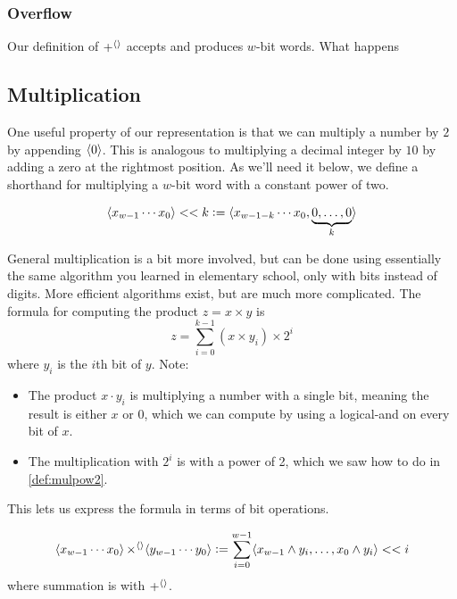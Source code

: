 \subsubsection{Overflow}

Our definition of $\operatorname{+^{\langle\rangle}}$ accepts and produces $w$-bit words.  What happens 

\subsection{Multiplication}
\label{sec:bit-multiplication}

One useful property of our representation is that we can multiply a
number by $2$ by appending $\langle 0 \rangle$.  This is analogous to
multiplying a decimal integer by $10$ by adding a zero at the
rightmost position.  As we'll need it below, we define a shorthand for
multiplying a $w$-bit word with a constant power of two.
\begin{definition}
  \begin{align*}
  \langle x_{w-1}\cdots{}x_{0} \rangle << k \vcentcolon=
  \langle x_{w-1-k}\cdots{}x_{0},\underbrace{0,\ldots,0}_{k} \rangle
  \end{align*}
  \label{def:mulpow2}
\end{definition}

General multiplication is a bit more involved, but can be done using
essentially the same algorithm you learned in elementary school, only
with bits instead of digits.  More efficient algorithms exist, but are
much more complicated.  The formula for computing the product
$z=x\times{}y$ is
\begin{equation}
  z = \sum_{i=0}^{k-1} (x \times y_{i}) \times 2^{i}
\end{equation}
where $y_{i}$ is the $i$th bit of $y$.  Note:
\begin{itemize}
\item The product $x \cdot y_{i}$ is multiplying a number with a
  single bit, meaning the result is either $x$ or $0$, which we can
  compute by using a logical-and on every bit of $x$.
\item The multiplication with $2^{i}$ is with a power of 2, which we
  saw how to do in \cref{def:mulpow2}.
\end{itemize}

This lets us express the formula in terms of bit operations.

\begin{definition}
\begin{align*}
  \langle x_{w-1}\cdots{}x_{0} \rangle \operatorname{\times^{\langle\rangle}} \langle y_{w-1}\cdots{}y_{0} \rangle \vcentcolon=
  \sum_{i=0}^{w-1} \langle x_{w-1} \land y_{i},\ldots,x_{0} \land y_{i} \rangle << i
\end{align*}
where summation is with $\operatorname{+^{\langle\rangle}}$.
\end{definition}

